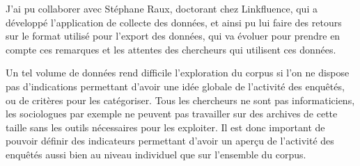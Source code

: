 J’ai pu collaborer avec Stéphane Raux, doctorant chez Linkfluence, qui a
développé l’application de collecte des données, et ainsi pu lui faire des
retours sur le format utilisé pour l’export des données, qui va évoluer pour
prendre en compte ces remarques et les attentes des chercheurs qui utilisent
ces données.

Un tel volume de données rend difficile l’exploration du corpus si l’on ne
dispose pas d’indications permettant d’avoir une idée globale de l’activité des
enquêtés, ou de critères pour les catégoriser. Tous les chercheurs ne sont pas
informaticiens, les sociologues par exemple ne peuvent pas travailler sur des
archives de cette taille sans les outils nécessaires pour les exploiter. Il est
donc important de pouvoir définir des indicateurs permettant d’avoir un aperçu
de l’activité des enquêtés aussi bien au niveau individuel que sur l’ensemble
du corpus.
